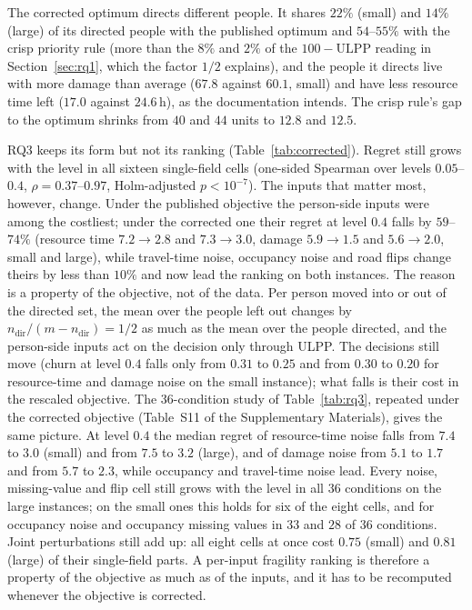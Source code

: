 \documentclass[systems,article,submit,moreauthors,pdftex]{Definitions/mdpi}
\begin{document}
The corrected optimum directs different people. It shares $22\%$ (small) and $14\%$ (large) of
its directed people with the published optimum and $54$--$55\%$ with the crisp priority rule (more than the $8\%$ and $2\%$ of the
$100-\mathrm{ULPP}$ reading in Section~\ref{sec:rq1}, which the factor $1/2$ explains), and
the people it directs live with more damage than average ($67.8$ against $60.1$, small) and have
less resource time left ($17.0$ against $24.6$\,h), as the documentation intends. The crisp
rule's gap to the optimum shrinks from $40$ and $44$ units to $12.8$ and $12.5$.



RQ3 keeps its form but not its ranking (Table~\ref{tab:corrected}). Regret still grows with the
level in all sixteen single-field cells (one-sided Spearman over levels $0.05$--$0.4$,
$\rho = 0.37$--$0.97$, Holm-adjusted $p < 10^{-7}$). The inputs that matter most, however,
change. Under the published objective the person-side inputs were among the costliest; under the
corrected one their regret at level $0.4$ falls by $59$--$74\%$ (resource time $7.2 \to 2.8$ and
$7.3 \to 3.0$, damage $5.9 \to 1.5$ and $5.6 \to 2.0$, small and large), while travel-time noise,
occupancy noise and road flips change theirs by less than $10\%$ and now lead the ranking on both
instances. The reason is a property of the objective, not of the data. Per person moved into or
out of the directed set, the mean over the people left out changes by
$n_{\mathrm{dir}}/(m - n_{\mathrm{dir}}) = 1/2$ as much as the mean over the people directed, and
the person-side inputs act on the decision only through ULPP. The decisions still move (churn
at level $0.4$ falls only from $0.31$ to $0.25$ and from $0.30$ to $0.20$ for resource-time and
damage noise on the small instance); what falls is their cost in the rescaled objective. The
36-condition study of Table~\ref{tab:rq3}, repeated under the corrected objective (Table~S11 of
the Supplementary Materials), gives the same picture. At level $0.4$ the median regret of
resource-time noise falls from $7.4$ to $3.0$ (small) and from $7.5$ to $3.2$ (large), and of
damage noise from $5.1$ to $1.7$ and from $5.7$ to $2.3$, while occupancy and travel-time noise
lead. Every noise, missing-value and flip cell still grows with the level in all $36$ conditions
on the large instances; on the small ones this holds for six of the eight cells, and for
occupancy noise and occupancy missing values in $33$ and $28$ of $36$ conditions. Joint
perturbations still add up: all eight cells at once cost $0.75$ (small) and $0.81$ (large) of
their single-field parts. A
per-input fragility ranking is
therefore a property of the objective as much as of the inputs, and it has to be recomputed
whenever the objective is corrected.
\end{document}
